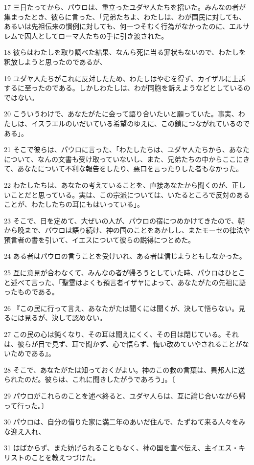 \par 17 三日たってから、パウロは、重立ったユダヤ人たちを招いた。みんなの者が集まったとき、彼らに言った、「兄弟たちよ、わたしは、わが国民に対しても、あるいは先祖伝来の慣例に対しても、何一つそむく行為がなかったのに、エルサレムで囚人としてローマ人たちの手に引き渡された。
\par 18 彼らはわたしを取り調べた結果、なんら死に当る罪状もないので、わたしを釈放しようと思ったのであるが、
\par 19 ユダヤ人たちがこれに反対したため、わたしはやむを得ず、カイザルに上訴するに至ったのである。しかしわたしは、わが同胞を訴えようなどとしているのではない。
\par 20 こういうわけで、あなたがたに会って語り合いたいと願っていた。事実、わたしは、イスラエルのいだいている希望のゆえに、この鎖につながれているのである」。
\par 21 そこで彼らは、パウロに言った、「わたしたちは、ユダヤ人たちから、あなたについて、なんの文書も受け取っていないし、また、兄弟たちの中からここにきて、あなたについて不利な報告をしたり、悪口を言ったりした者もなかった。
\par 22 わたしたちは、あなたの考えていることを、直接あなたから聞くのが、正しいことだと思っている。実は、この宗派については、いたるところで反対のあることが、わたしたちの耳にもはいっている」。
\par 23 そこで、日を定めて、大ぜいの人が、パウロの宿につめかけてきたので、朝から晩まで、パウロは語り続け、神の国のことをあかしし、またモーセの律法や預言者の書を引いて、イエスについて彼らの説得につとめた。
\par 24 ある者はパウロの言うことを受けいれ、ある者は信じようともしなかった。
\par 25 互に意見が合わなくて、みんなの者が帰ろうとしていた時、パウロはひとこと述べて言った、「聖霊はよくも預言者イザヤによって、あなたがたの先祖に語ったものである。
\par 26 『この民に行って言え、あなたがたは聞くには聞くが、決して悟らない。見るには見るが、決して認めない。
\par 27 この民の心は鈍くなり、その耳は聞えにくく、その目は閉じている。それは、彼らが目で見ず、耳で聞かず、心で悟らず、悔い改めていやされることがないためである』。
\par 28 そこで、あなたがたは知っておくがよい。神のこの救の言葉は、異邦人に送られたのだ。彼らは、これに聞きしたがうであろう」。〔
\par 29 パウロがこれらのことを述べ終ると、ユダヤ人らは、互に論じ合いながら帰って行った。〕
\par 30 パウロは、自分の借りた家に満二年のあいだ住んで、たずねて来る人々をみな迎え入れ、
\par 31 はばからず、また妨げられることもなく、神の国を宣べ伝え、主イエス・キリストのことを教えつづけた。


